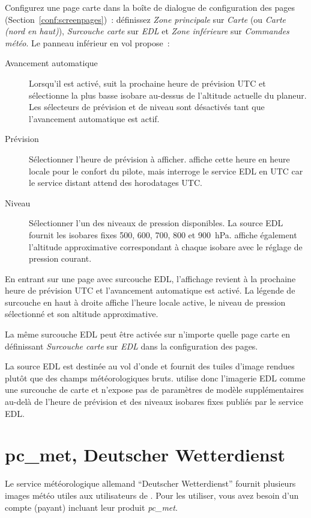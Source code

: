 Configurez une page carte dans la boîte de dialogue de configuration des
pages (Section~\ref{conf:screenpages})~: définissez \emph{Zone principale}
sur \emph{Carte} (ou \emph{Carte (nord en haut)}), \emph{Surcouche carte}
sur \emph{EDL} et \emph{Zone inférieure} sur \emph{Commandes météo}.  Le
panneau inférieur en vol propose~:
\begin{description}
\item[Avancement automatique]
  Lorsqu'il est activé, \xc{} suit la prochaine heure de prévision UTC et
  sélectionne la plus basse isobare au-dessus de l'altitude actuelle du
  planeur.  Les sélecteurs de prévision et de niveau sont désactivés tant
  que l'avancement automatique est actif.
\item[Prévision]
  Sélectionner l'heure de prévision à afficher. \xc{} affiche cette
  heure en heure locale pour le confort du pilote, mais interroge le
  service EDL en UTC car le service distant attend des horodatages UTC.
\item[Niveau]
  Sélectionner l'un des niveaux de pression disponibles. La source EDL
  fournit les isobares fixes 500, 600, 700, 800 et 900~hPa. \xc{}
  affiche également l'altitude approximative correspondant à chaque
  isobare avec le réglage de pression courant.
\end{description}

En entrant sur une page avec surcouche EDL, l'affichage revient à la
prochaine heure de prévision UTC et l'avancement automatique est activé.
La légende de surcouche en haut à droite affiche l'heure locale active,
le niveau de pression sélectionné et son altitude approximative.

La même surcouche EDL peut être activée sur n'importe quelle page carte en
définissant \emph{Surcouche carte} sur \emph{EDL} dans la configuration
des pages.

La source EDL est destinée au vol d'onde et fournit des tuiles d'image
rendues plutôt que des champs météorologiques bruts. \xc{} utilise donc
l'imagerie EDL comme une surcouche de carte et n'expose pas de
paramètres de modèle supplémentaires au-delà de l'heure de prévision et
des niveaux isobares fixes publiés par le service EDL.

\section{pc\_met, Deutscher Wetterdienst}\label{sec:pcmet}

Le service météorologique allemand ``Deutscher Wetterdienst'' fournit plusieurs images météo utiles aux utilisateurs de \xc.
Pour les utiliser, vous avez besoin d'un compte (payant) incluant leur produit \emph{pc\_met}.


